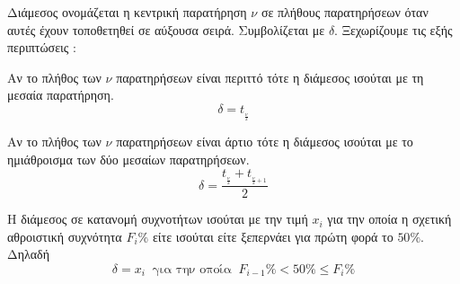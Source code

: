 Διάμεσος ονομάζεται η κεντρική παρατήρηση $ \nu $ σε πλήθους παρατηρήσεων όταν αυτές έχουν τοποθετηθεί σε αύξουσα σειρά. Συμβολίζεται με $ \delta $. Ξεχωρίζουμε τις εξής περιπτώσεις :
\begin{rlist}
\item Αν το πλήθος των $ \nu $ παρατηρήσεων είναι περιττό τότε η διάμεσος ισούται με τη μεσαία παρατήρηση.
\[ \delta=t_{_{\frac{\nu}{2}}} \]
\item Αν το πλήθος των $ \nu $ παρατηρήσεων είναι άρτιο τότε η διάμεσος ισούται με το ημιάθροισμα των δύο μεσαίων παρατηρήσεων.
\[ \delta=\frac{t_{_{\frac{\nu}{2}}}+t_{_{\frac{\nu}{2}+1}}}{2} \]
\end{rlist}
Η διάμεσος σε κατανομή συχνοτήτων ισούται με την τιμή $ x_i $ για την οποία η σχετική αθροιστική συχνότητα $ F_i\% $ είτε ισούται είτε ξεπερνάει για πρώτη φορά το $ 50\% $. Δηλαδή
\[ \delta=x_i\ \textrm{ για την οποία }\ F_{i-1}\%<50\%\leq F_i\% \]
